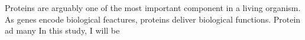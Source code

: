 Proteins are arguably one of the most important component in a living organism. As genes encode biological feactures, proteins deliver biological functions. Protein ad many  In this study, I will be 